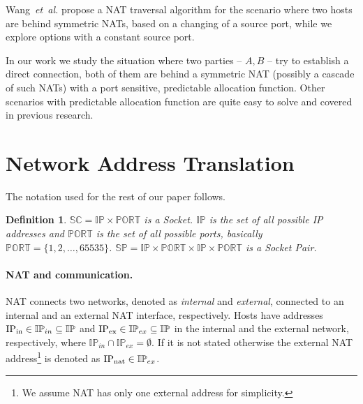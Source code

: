 \documentclass{llncs}
\newtheorem{mydef}{Definition}
\begin{document}
Wang~\emph{et~al.} \citep{Wang:2006:RSN:1156422.1156550} propose a NAT traversal algorithm for the scenario where two hosts are
behind symmetric NATs, based on a changing of a source port, while we explore options with a constant source port.

In our work we study the situation where two parties -- $A, B$ -- try to establish a direct connection, both of them are behind 
a symmetric NAT (possibly a cascade of such NATs) with a port sensitive, predictable allocation function. Other scenarios with
predictable allocation function are quite easy to solve and covered in previous research. 

\section{Network Address Translation}
The notation used for the rest of our paper follows.


\begin{mydef}
$\mathbb{SC} = \mathbb{IP} \times \mathbb{PORT}$
 is a Socket. $\mathbb{IP}$ is the set of all possible IP addresses and $\mathbb{PORT}$ 
is the set of all possible ports, basically $\mathbb{PORT} = \{1,2,\dots,65535\}$.
$\mathbb{SP} = \mathbb{IP} \times \mathbb{PORT} \times \mathbb{IP} \times \mathbb{PORT}$
 is a Socket Pair.
\end{mydef}
% 

\paragraph{NAT and communication.}
NAT connects two networks, denoted as {\em internal} and {\em external}, connected to an internal and an external NAT interface, respectively.
Hosts have addresses $\text{IP\textsubscript{in}} \in \mathbb{IP}_{in} \subseteq \mathbb{IP}$ 
and $\text{IP\textsubscript{ex}} \in \mathbb{IP}_{ex} \subseteq \mathbb{IP}$ in the internal and the external network,
respectively, where $\mathbb{IP}_{in} \cap \mathbb{IP}_{ex} = \emptyset$.
If it is not stated otherwise the external NAT address\footnote{We assume NAT has only one external address for simplicity.} is denoted as 
$\text{IP\textsubscript{nat}} \in \mathbb{IP}_{ex}$.
\end{document}
